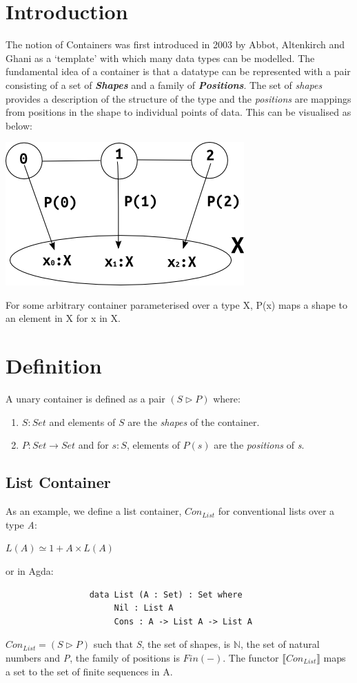\documentclass[12pt]{report}
\begin{document}
\section{Introduction}
The notion of Containers was first introduced in 2003 by Abbot, Altenkirch and Ghani\cite{coc} as a `template' with which many data types can be modelled. The fundamental idea of a container is that a datatype can be represented with a pair consisting of a set of \textit{\textbf{Shapes}} and a family of \textit{\textbf{Positions}}. The set of \textit{shapes} provides a description of the structure of the type and the \textit{positions} are mappings from positions in the shape to individual points of data. This can be visualised as below:
\begin{center}
\includegraphics[scale=0.65]{4.png}
\end{center}
For some arbitrary container parameterised over a type X, P(x) maps a shape to an element in X for x in X.
\section{Definition}
A unary container is defined as a pair $ (S \rhd P) $ where:
\begin{enumerate}
\item $S : Set$ and elements of $S$ are the \textit{shapes} of the container.
\item $P : Set \to Set$ and for $s : S$, elements of $P(s)$ are the \textit{positions} of \textit{s}.
\end{enumerate}

\subsection{List Container}
As an example, we define a list container, $Con_{List}$ for conventional lists over a type \textit{A}:
\begin{center}
$ L(A) \simeq 1 + A \times L(A) $
\end{center}
or in Agda:
\begin{verbatim}
                 data List (A : Set) : Set where
                      Nil : List A
                      Cons : A -> List A -> List A
\end{verbatim}
 $Con_{List} = (S \rhd P) $ such that \textit{S}, the set of shapes, is $\mathbb{N}$, the set of natural numbers and \textit{P}, the family of positions is $Fin(-)$. The functor $\llbracket Con_{List} \rrbracket$ maps a set to the set of finite sequences in A.
\end{document}
